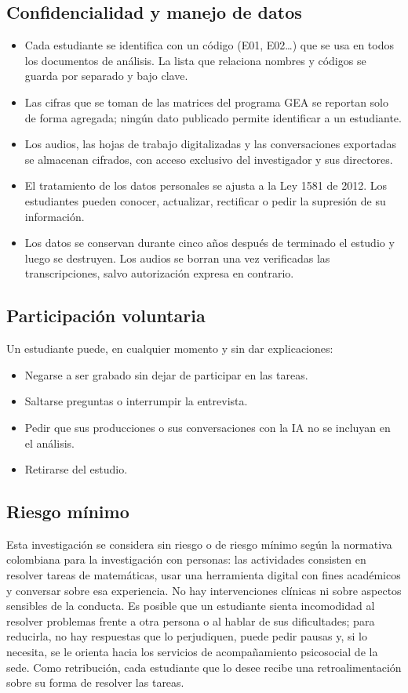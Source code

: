 \subsection{Confidencialidad y manejo de datos}

\begin{itemize}
\item Cada estudiante se identifica con un código (E01, E02\ldots) que se usa en todos los documentos de análisis. La lista que relaciona nombres y códigos se guarda por separado y bajo clave.
\item Las cifras que se toman de las matrices del programa GEA se reportan solo de forma agregada; ningún dato publicado permite identificar a un estudiante.
\item Los audios, las hojas de trabajo digitalizadas y las conversaciones exportadas se almacenan cifrados, con acceso exclusivo del investigador y sus directores.
\item El tratamiento de los datos personales se ajusta a la Ley 1581 de 2012. Los estudiantes pueden conocer, actualizar, rectificar o pedir la supresión de su información.
\item Los datos se conservan durante cinco años después de terminado el estudio y luego se destruyen. Los audios se borran una vez verificadas las transcripciones, salvo autorización expresa en contrario.
\end{itemize}

\subsection{Participación voluntaria}

Un estudiante puede, en cualquier momento y sin dar explicaciones:

\begin{itemize}
\item Negarse a ser grabado sin dejar de participar en las tareas.
\item Saltarse preguntas o interrumpir la entrevista.
\item Pedir que sus producciones o sus conversaciones con la IA no se incluyan en el análisis.
\item Retirarse del estudio.
\end{itemize}

\subsection{Riesgo mínimo}

Esta investigación se considera sin riesgo o de riesgo mínimo según la normativa colombiana para la investigación con personas: las actividades consisten en resolver tareas de matemáticas, usar una herramienta digital con fines académicos y conversar sobre esa experiencia. No hay intervenciones clínicas ni sobre aspectos sensibles de la conducta. Es posible que un estudiante sienta incomodidad al resolver problemas frente a otra persona o al hablar de sus dificultades; para reducirla, no hay respuestas que lo perjudiquen, puede pedir pausas y, si lo necesita, se le orienta hacia los servicios de acompañamiento psicosocial de la sede. Como retribución, cada estudiante que lo desee recibe una retroalimentación sobre su forma de resolver las tareas.
